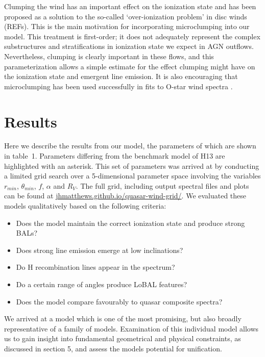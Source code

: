 \documentclass[preprint, a4paper, 11pt]{aastex}
\begin{document}
Clumping the wind has an important effect on the ionization state and has
been proposed as a solution to the so-called `over-ionization problem' in 
disc winds (REFs). This is the main motivation for incorporating microclumping
into our model. This treatment is first-order; it does not adequately
represent the complex substructures and stratifications in ionization
state we expect in AGN outflows. Nevertheless, clumping is clearly
important in these flows, and this parameterization allows a simple estimate
for the effect clumping might have on the ionization state and emergent 
line emission. It is also encouraging that microclumping has been used 
successfully in fits to O-star wind spectra \citep{hillier1991eswingsmodel}.











\section{Results}

Here we describe the results from our model, the parameters
of which are shown in table~1.
Parameters differing from the benchmark model of
H13 are highlighted with an asterisk.
This set of parameters
was arrived at by conducting a limited grid search over a 
5-dimensional parameter space involving the variables
$r_{min}$, $\theta_{min}$, $f$, $\alpha$ and $R_V$.
The full grid, including output spectral files and plots can be found at
\url{jhmatthews.github.io/quasar-wind-grid/}.
We evaluated these models qualitatively based on the following
criteria:
\begin{itemize}
\item Does the model maintain the correct ionization state and produce strong BALs?
\item Does strong line emission emerge at low inclinations?
\item Do H recombination lines appear in the spectrum?
\item Do a certain range of angles produce LoBAL features?
\item Does the model compare favourably to quasar composite spectra?
\end{itemize}
We arrived at a model which is one of the most promising,
but also broadly representative of a family of models. 
Examination of this individual model allows us to gain insight
into fundamental geometrical and physical constraints, 
as discussed in section 5, and assess the models potential
for unification. 
\end{document}
